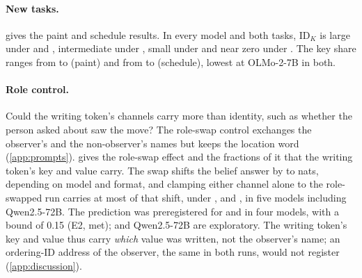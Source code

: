 \begin{table}[!ht]
\centering
\caption{\textbf{Depth and KV-group localisation of the option-word key read} (Qwen2.5-1.5B, FP32). Entries are fractions of the effect obtained when the option-word rows see the source key in every layer and both KV groups, with 95\% bootstrap CIs over stories (ratio of means recomputed in each resample). $n = 40$ stories per format. Exploratory.}
\label{tab:windows}

\end{table}

\paragraph{New tasks.}  gives the paint and schedule results. In every model and both tasks, $\mathrm{ID}_K$ is large under \fmtLetter{} and \fmtOpt{}, intermediate under \fmtPost{}, small under \fmtNone{} and near zero under \fmtBefore{}. The \fmtOpt{} key share ranges from \taskPaintShareMin{} to \taskPaintShareMax{} (paint) and from \taskScheduleShareMin{} to \taskScheduleShareMax{} (schedule), lowest at OLMo-2-7B in both.

\begin{table}[!ht]
\centering
\caption{\textbf{Paint and schedule tasks.} Key share under \fmtOpt{} and $\mathrm{ID}_K$ (nats) in each format, clamped from layer~0. $n = 150$ stories per task, format and model; 95\% bootstrap CIs. Preregistration D (D1, D2) for \fmtOpt{}, \fmtNone{} and \fmtBefore{}; the rest exploratory.}
\label{tab:tasks}
\resizebox{\textwidth}{!}{}
\end{table}

\paragraph{Role control.} Could the writing token's channels carry more than identity, such as whether the person asked about saw the move? The role-swap control exchanges the observer's and the non-observer's names but keeps the location word (\cref{app:prompts}).  gives the role-swap effect and the fractions of it that the writing token's key and value carry. The swap shifts the belief answer by \roleEffMin{} to \roleEffMax{} nats, depending on model and format, and clamping either channel alone to the role-swapped run carries at most \roleFracMax{} of that shift, under \fmtOpt{}, \fmtNone{} and \fmtLetter{}, in five models including Qwen2.5-72B. The prediction was preregistered for \fmtOpt{} and \fmtNone{} in four models, with a bound of 0.15 (E2, met); \fmtLetter{} and Qwen2.5-72B are exploratory. The writing token's key and value thus carry \emph{which} value was written, not the observer's name; an ordering-ID address of the observer, the same in both runs, would not register (\cref{app:discussion}).

